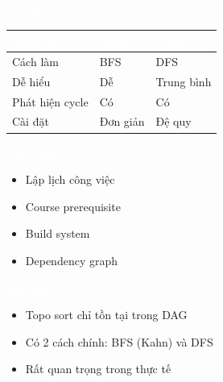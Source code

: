 \documentclass{beamer}
\newcommand{\hlgreen}[1]{\textcolor{mygreen}{#1}}
\newcommand{\hlwhite}[1]{\textcolor{white}{#1}}
\begin{document}
\begin{frame}{\hlwhite{So sánh}}
\centering
\renewcommand{\arraystretch}{1.5}

\begin{tabular}{|m{3cm}|m{4cm}|m{4cm}|}
\hline
\rowcolor{myblue!70}
\textcolor{white}{\textbf{Tiêu chí}} &
\textcolor{white}{\textbf{Kahn}} &
\textcolor{white}{\textbf{DFS}} \\
\hline

Cách làm & BFS & DFS \\
\hline

Dễ hiểu & \hlgreen{Dễ} & Trung bình \\
\hline

Phát hiện cycle & \hlgreen{Có} & Có \\
\hline

Cài đặt & Đơn giản & Đệ quy \\
\hline
\end{tabular}
\end{frame}


\begin{frame}{\hlwhite{Ứng dụng}}
\begin{itemize}
\item Lập lịch công việc
\item Course prerequisite
\item Build system
\item Dependency graph
\end{itemize}
\end{frame}


\begin{frame}{\hlwhite{Kết luận}}
\begin{itemize}
\item Topo sort chỉ tồn tại trong DAG
\item Có 2 cách chính: BFS (Kahn) và DFS
\item Rất quan trọng trong thực tế
\end{itemize}

\end{frame}
\end{document}
